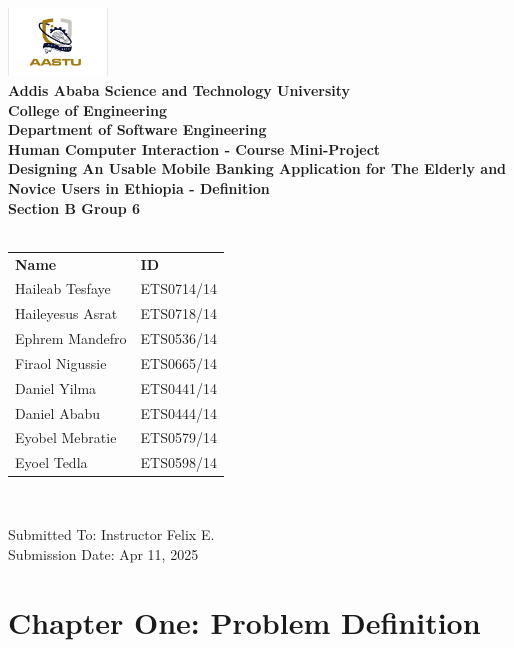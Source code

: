 \documentclass[a4paper,12pt]{report}
\begin{document}
\begin{titlepage}
  \centering
  \includegraphics[width=100px]{../shared/images/aastu_logo.png} \\
  {\large\bfseries Addis Ababa Science and Technology University} \\
  {\large\bfseries College of Engineering} \\
  {\large\bf Department of Software Engineering} \\[5mm]
  {\Large\bf Human Computer Interaction - Course Mini-Project} \\[5mm]
  {\Huge\bfseries Designing An Usable Mobile Banking Application for The Elderly and Novice Users in Ethiopia - Definition} \\ [2cm]
  {\Large\bfseries Section B Group 6 } \\[2mm]
  {\Large\bfseries{}} \\ [5mm]
  \begin{tabular}{ll}
    \large\textbf{Name}     & \large\textbf{ID} \\
    \large Haileab Tesfaye  & \large ETS0714/14 \\
    \large Haileyesus Asrat & \large ETS0718/14 \\
    \large Ephrem Mandefro  & \large ETS0536/14 \\
    \large Firaol Nigussie  & \large ETS0665/14 \\
    \large Daniel Yilma     & \large ETS0441/14 \\
    \large Daniel Ababu     & \large ETS0444/14 \\
    \large Eyobel Mebratie  & \large ETS0579/14 \\
    \large Eyoel Tedla      & \large ETS0598/14 \\
  \end{tabular} \\[4cm]

  \begin{flushright}
    {\large Submitted To: Instructor Felix E.}\\
    {\large Submission Date: Apr 11, 2025}
  \end{flushright}

\end{titlepage}
\tableofcontents
\chapter*{Chapter One: Problem Definition}
\setcounter{chapter}{1}
\setcounter{page}{1}
\end{document}
